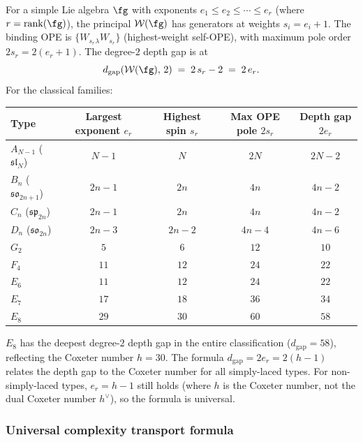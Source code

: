 \begin{remark}
\label{rem:exponent-depth}
%
For a simple Lie algebra $\fg$ with exponents
$e_1 \le e_2 \le \cdots \le e_r$ (where $r = \mathrm{rank}(\fg)$),
the principal $\mathcal{W}(\fg)$ has generators at weights
$s_i = e_i + 1$. The binding OPE is $\{W_{s_r}{}_\lambda W_{s_r}\}$
(highest-weight self-OPE), with maximum pole order $2s_r = 2(e_r + 1)$.
The degree-$2$ depth gap is at
\begin{equation}
\label{eq:exponent-depth}
d_{\mathrm{gap}}(\mathcal{W}(\fg),\, 2)
\;=\; 2\,s_r - 2
\;=\; 2\,e_r.
\end{equation}
For the classical families:
\begin{center}
\small
\renewcommand{\arraystretch}{1.3}
\begin{tabular}{lcccc}
\toprule
\textbf{Type} & \textbf{Largest exponent $e_r$}
 & \textbf{Highest spin $s_r$}
 & \textbf{Max OPE pole $2s_r$}
 & \textbf{Depth gap $2e_r$} \\
\midrule
$A_{N-1}$ ($\mathfrak{sl}_N$) & $N - 1$ & $N$ & $2N$ & $2N - 2$ \\
$B_n$ ($\mathfrak{so}_{2n+1}$) & $2n - 1$ & $2n$ & $4n$ & $4n - 2$ \\
$C_n$ ($\mathfrak{sp}_{2n}$) & $2n - 1$ & $2n$ & $4n$ & $4n - 2$ \\
$D_n$ ($\mathfrak{so}_{2n}$) & $2n - 3$ & $2n - 2$ & $4n - 4$ & $4n - 6$ \\
$G_2$ & $5$ & $6$ & $12$ & $10$ \\
$F_4$ & $11$ & $12$ & $24$ & $22$ \\
$E_6$ & $11$ & $12$ & $24$ & $22$ \\
$E_7$ & $17$ & $18$ & $36$ & $34$ \\
$E_8$ & $29$ & $30$ & $60$ & $58$ \\
\bottomrule
\end{tabular}
\end{center}
\noindent
$E_8$ has the deepest degree-$2$ depth gap in the entire classification
($d_{\mathrm{gap}} = 58$), reflecting the Coxeter number $h = 30$.
The formula $d_{\mathrm{gap}} = 2e_r = 2(h - 1)$ relates the depth
gap to the Coxeter number for all simply-laced types. For
non-simply-laced types, $e_r = h - 1$ still holds (where $h$ is the
Coxeter number, not the dual Coxeter number $h^\vee$), so the formula
is universal.
\end{remark}

\subsubsection{Universal complexity transport formula}
\label{subsubsec:universal-complexity}

